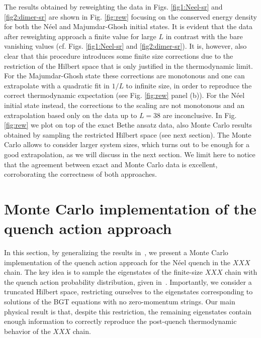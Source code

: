 \documentclass[11pt]{iopart}
\begin{document}
The results obtained by reweighting the data in Figs. \ref{fig1:Neel-sr} and \ref{fig2:dimer-sr}
are shown in Fig. \ref{fig:rew} focusing on the conserved energy density for both the N\'eel and 
Majumdar-Ghosh initial states. 
It is evident that the data after reweighting approach a finite value for large $L$ in contrast with the bare vanishing values 
(cf. Figs.  \ref{fig1:Neel-sr} and \ref{fig2:dimer-sr}). 
It is, however, also clear that this procedure introduces some finite size corrections due to the restriction of the Hilbert space that is 
only justified in the thermodynamic limit. 
%
For the Majumdar-Ghosh state these corrections are monotonous and one can extrapolate with a quadratic fit in $1/L$
to infinite size, in order to reproduce the correct thermodynamic expectation (see Fig. \ref{fig:rew} panel (b)).
%
For the N\'eel initial state instead, the corrections to the scaling are not monotonous and an extrapolation 
based only on the data up to $L=38$ are inconclusive. 
In Fig. \ref{fig:rew} we plot on top of the exact Bethe ansatz data, also Monte Carlo results obtained by sampling the restricted 
Hilbert space (see next section). 
The Monte Carlo allows to consider larger system sizes, which turns out to be enough for a good extrapolation, as we
will discuss in the next section. 
We limit here to notice that the agreement between exact and Monte Carlo data is excellent, corroborating 
the correctness of both approaches.  

\section{Monte Carlo implementation of the quench action approach}
\label{sec6:mcqa}

In this section, by generalizing the results in~\cite{alba-2015}, we present 
a Monte Carlo implementation of the quench action approach for the N\'eel quench in 
the $XXX$ chain. The key idea is to sample the eigenstates of the finite-size $XXX$ 
chain with the quench action probability distribution, given in~. 
Importantly, we consider a truncated Hilbert space, restricting ourselves to the 
eigenstates corresponding to solutions of the BGT equations with no zero-momentum 
strings. Our main physical result is that, despite this restriction, the remaining 
eigenstates contain enough information to correctly reproduce the post-quench 
thermodynamic behavior of the $XXX$ chain. 
\end{document}
